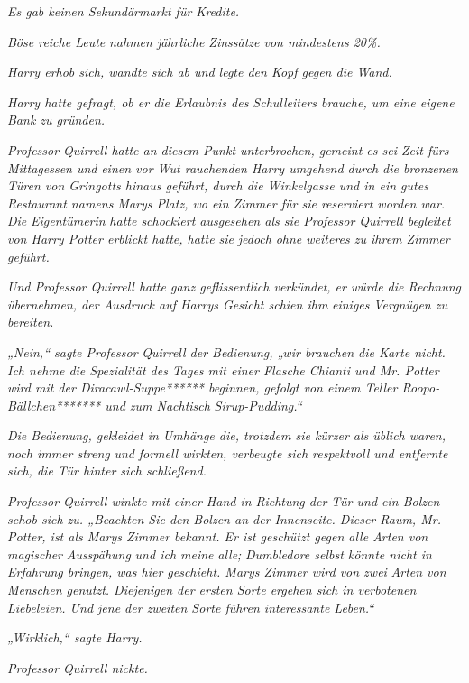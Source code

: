 {\emph{Es gab keinen Sekundärmarkt für Kredite.}

\emph{Böse reiche Leute} \emph{nahmen jährliche Zinssätze von mindestens 20\%.}

\emph{Harry erhob sich, wandte sich ab und legte den Kopf gegen die Wand.}

\emph{Harry hatte gefragt, ob er die Erlaubnis des Schulleiters brauche, um eine eigene Bank zu gründen.}

\emph{Professor Quirrell hatte an diesem Punkt unterbrochen, gemeint es sei Zeit fürs Mittagessen und} \emph{einen vor Wut rauchenden Harry umgehend durch die bronzenen Türen von Gringotts hinaus geführt, durch die Winkelgasse und in ein gutes Restaurant namens Marys Platz, wo ein Zimmer für sie reserviert worden war. Die} \emph{Eigentümerin} \emph{hatte schockiert ausgesehen als sie Professor Quirrell begleitet von Harry Potter erblickt hatte, hatte sie} \emph{jedoch} \emph{ohne weiteres zu ihrem Zimmer geführt.}

\emph{Und Professor Quirrell hatte ganz geflissentlich verkündet, er würde die Rechnung übernehmen, der Ausdruck auf Harrys Gesicht schien ihm} \emph{einiges} \emph{Vergnügen zu bereiten.}

\emph{„Nein,“ sagte Professor} \emph{Quirrell der Bedienung, „wir brauchen die Karte nicht. Ich nehme die Spezialität des Tages mit einer Flasche Chianti und Mr. Potter wird mit der Diracawl-Suppe****** beginnen, gefolgt von einem Teller Roopo-Bällchen******* und zum Nachtisch} \emph{Sirup-Pudding.“}

\emph{Die Bedienung, gekleidet in Umhänge die, trotzdem sie kürzer als üblich waren, noch immer streng} \emph{und} \emph{formell wirkten, verbeugte sich respektvoll und entfernte sich, die Tür hinter sich schließend.}

\emph{Professor Quirrell winkte mit einer Hand in Richtung der Tür und ein Bolzen schob sich zu. „Beachten Sie den Bolzen an der Innenseite. Dieser Raum, Mr. Potter, ist als Marys Zimmer bekannt. Er ist geschützt gegen alle Arten von magischer} \emph{Ausspähung} \emph{und ich meine} \emph{\emph{alle;}} \emph{Dumbledore selbst könnte nicht in Erfahrung bringen, was hier geschieht. Marys Zimmer wird von zwei} \emph{Arten von Menschen genutzt. Diejenigen der ersten Sorte ergehen sich in verbotenen Liebeleien. Und jene der zweiten Sorte führen interessante Leben.“}

\emph{„\emph{Wirklich,}“ sagte Harry.}

\emph{Professor Quirrell nickte.}

}
